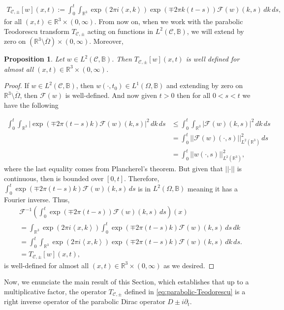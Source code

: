 \documentclass[12pt]{article}
\newtheorem{proposition}[theorem]{Proposition}
\def\R{\mathbb{R}}
\def\B{\mathbb{B}}
\def\R{\mathbb{R}}
\newcommand{\inner}[1]{\left\langle #1 \right\rangle}
\newcommand{\norm}[1]{\left|\left| #1 \right|\right|}
\newcommand{\fourier}[1]{\mathcal{F}\left( #1 \right)}
\newcommand{\fourierinv}[1]{\mathcal{F}^{-1}\left( #1 \right)}
\newcommand{\expo}[1]{\exp\left( #1\right)}
\begin{document}
\begin{align}\label{eq:parabolic-Teodorescu}
T_{\mathscr{C},\pm}[w](x,t):=\int_0^t\int_{\R^3}\expo{2\pi i\inner{x,k}}\expo{\mp 2\pi k(t-s)}\fourier{w}(k,s)\, dk\, ds, 
\end{align}
for all $(x,t)\in \mathbb{R}^3\times(0,\infty)$. From now on, when we work with the parabolic Teodorescu transform $T_{\mathscr{C},\pm}$ acting on functions in $L^2(\mathscr{C},\B)$, we will extend by zero on $(\mathbb{R}^3\setminus \overline{\Omega}) \times (0,\infty)$. Moreover, 
\begin{proposition}\label{prop:well-defined}
    Let $w\in L^2(\mathscr{C},\B)$. Then $T_{\mathscr{C},\pm}[w](x,t)$ is well defined for almost all $(x,t)\in \mathbb{R}^3\times(0,\infty)$.
\end{proposition}
\begin{proof}
If $w\in L^2(\mathscr{C},\B)$, then $w(\cdot,t_0)\in L^1(\Omega, \mathbb{B})$ and extending by zero on $\mathbb{R}^3\setminus \overline{\Omega}$, then $\fourier{w}$ is well-defined. And now given $t>0$ then for all $0<s<t$ we have the following

    \begin{align*}
        \int_0^t\int_{\R^3}|\expo{\mp 2\pi (t-s)k}\fourier{w}(k,s)|^2\, dk\, ds&\leq\int_0^t\int_{\R^3}|\fourier{w}(k,s)|^2\, dk\, ds\\
        &=\int_0^t\norm{\fourier{w}(\cdot,s)}_{L^2(\mathbb{R}^3)}^2\, ds\\
        &=\int_0^t\norm{{w}(\cdot,s)}_{L^2(\mathbb{R}^3)}^2,
    \end{align*}
where the last equality comes from Plancherel's theorem. But given that $\norm{\cdot}$ is continuous, then is bounded over $[0,t]$. Therefore, $\int_0^t\expo{\mp 2\pi (t-s)k}\fourier{w}(k,s)\, ds$ is in $L^2(\Omega,\B)$ meaning it has a Fourier inverse. Thus,
 \begin{align*}
        &\fourierinv{\int_0^t\expo{\mp2\pi(t-s)}\fourier{w}(k,s)\,ds}(x)\\
        &=\int_{\R^3}\expo{2\pi i\inner{x,k}}\int_0^t\expo{\mp 2\pi(t-s)k}\fourier{w}(k,s)\,ds\, dk\\
        &=\int_0^t\int_{\R^3}\expo{2\pi i\inner{x,k}}\expo{\mp 2\pi(t-s)k}\fourier{w}(k,s)\, dk\, ds.\\
        &=T_{\mathscr{C},\pm}[w](x,t),
    \end{align*}
is well-defined for almost all $(x,t)\in \mathbb{R}^3\times(0,\infty)$ as we desired.
\end{proof}
Now, we enunciate the main result of this Section, which establishes that up to a multiplicative factor, the operator $T_{\mathscr{C},\pm}$ defined in \eqref{eq:parabolic-Teodorescu} is a right inverse operator of the parabolic Dirac operator $D\pm i\partial_t$.
\end{document}
